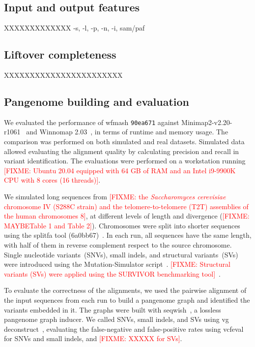 \documentclass{bioinfo}
\theoremstyle{definition}
\newcommand{\red}[1]{{\textcolor{Red}{#1}}}
\newcommand{\FIXME}[1]{\red{[FIXME: #1]}}
\begin{document}
\subsection{Input and output features}
XXXXXXXXXXXXX -s, -l, -p, -n, -i, sam/paf

\subsection{Liftover completeness}
XXXXXXXXXXXXXXXXXXXXXXX

\subsection{Pangenome building and evaluation}
We evaluated the performance of wfmash \texttt{90ea671} against Minimap2-v2.20-r1061~\citep{Li_2018} and Winnomap 2.03~\citep{Jain_2020b}, in terms of runtime and memory usage.
The comparison was performed on both simulated and real datasets. Simulated data allowed evaluating the alignment quality by calculating precision and recall in variant identification.
The evaluations were performed on a workstation running \FIXME{Ubuntu 20.04 equipped with 64 GB of RAM and an Intel i9-9900K CPU with 8 cores (16 threads)}.

We simulated long sequences from \FIXME{the \textit{Saccharomyces cerevisiae} chromosome IV (S288C strain) and the telomere-to-telomere (T2T) assemblies of the human chromosomes 8}, at different levels of length and divergence (\FIXME{MAYBETable 1 and Table 2}).
Chromosomes were split into shorter sequences using the splitfa tool (6a0bb67)~\citep{splitfa-gh}.
In each run, all sequences have the same length, with half of them in reverse complement respect to the source chromosome.
Single nucleotide variants~(SNVs), small indels, and structural variants~(SVs) were introduced using the Mutation-Simulator script~\citep{Khl2020}.
\FIXME{Structural variants (SVs) were applied using the SURVIVOR benchmarking tool}~\citep{Jeffares2017}.

To evaluate the correctness of the alignments, we used the pairwise alignment of the input sequences from each run to build a pangenome graph and identified the variants embedded in it.
The graphs were built with seqwish~\citep{Garrison2022}, a lossless pangenome graph inducer.
We called SNVs, small indels, and SVs using vg deconstruct~\citep{Garrison:2018}, evaluating the false-negative and false-positive rates using vcfeval~\citep{Cleary2015} for SNVs and small indels, and \FIXME{XXXXX for SVs}.
\end{document}
